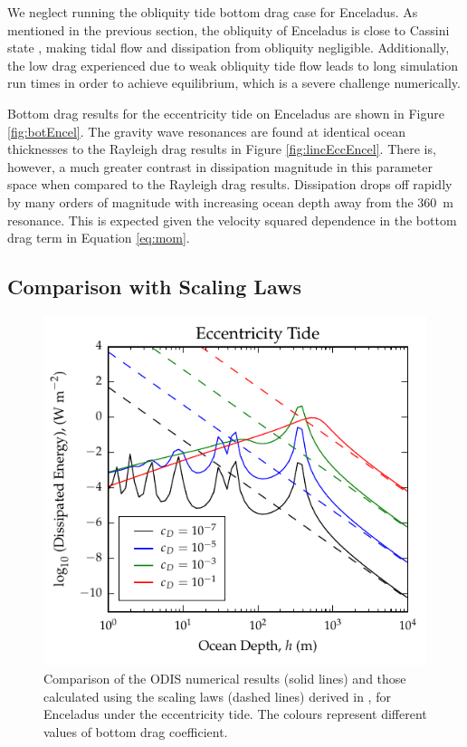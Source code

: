 We neglect running the obliquity tide bottom drag case for Enceladus. As mentioned in the previous section, the obliquity of Enceladus is close to Cassini state \citep{chen2011obliquity,chen2013tidal}, making tidal flow and dissipation from obliquity negligible. Additionally, the low drag experienced due to weak obliquity tide flow leads to long simulation run times in order to achieve equilibrium, which is a severe challenge numerically.

Bottom drag results for the eccentricity tide on Enceladus are shown in Figure \ref{fig:botEncel}. The gravity wave resonances are found at identical ocean thicknesses to the Rayleigh drag results in Figure \ref{fig:lincEccEncel}. There is, however, a much greater contrast in dissipation magnitude in this parameter space when compared to the Rayleigh drag results. Dissipation drops off rapidly by many orders of magnitude with increasing ocean depth away from the \SI{360}{\metre} resonance. This is expected given the velocity squared dependence in the bottom drag term in Equation \ref{eq:mom}. 

\subsection{Comparison with Scaling Laws}

\begin{figure}[!t]
\centering
\includegraphics[width=0.85\linewidth]{Figures/enceladus_scaling}
\caption{Comparison of the ODIS numerical results (solid lines) and those calculated using the scaling laws (dashed lines) derived in \citet{chen2013tidal}, for Enceladus under the eccentricity tide. The colours represent different values of bottom drag coefficient. \label{fig:scalEncel}}
\end{figure}

